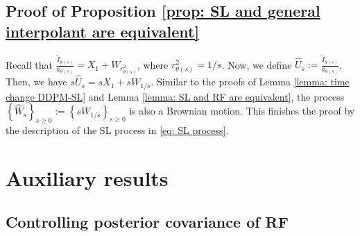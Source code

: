 \documentclass{article}
\theoremstyle{plain}
\theoremstyle{definition}
\theoremstyle{remark}
\newcommand{\bc}[1]{\left\{{#1}\right\}}
\begin{document}
\subsection{Proof of Proposition \ref{prop: SL and general interpolant are equivalent}}
\label{app: proof of SL and general interpolants equivalence}
Recall that $\frac{\tilde I_{\theta(s)}}{a_{\theta(s)}} = X_1 + W_{r^2_{\theta(s)}}$, where $r^2_{\theta(s)} = 1/s$. Now, we define $\hat U_s:= \frac{\tilde I_{\theta(s)}}{a_{\theta(s)}}$. Then, we have $s \hat U_s = s X_1 + s W_{1/s}$. Similar to the proofs of Lemma \ref{lemma: time change DDPM-SL} and Lemma \ref{lemma: SL and RF are equivalent}, the process $\bc{\hat W_s}_{s \ge 0}:= \bc{s W_{1/s}}_{s \ge 0}$ is also a Brownian motion. This finishes the proof by the description of the SL process in \eqref{eq: SL process}. 

\section{Auxiliary results}
\label{app: auxiliary results}

\subsection{Controlling posterior covariance of RF}
\label{sec: RF covariance}
\end{document}
